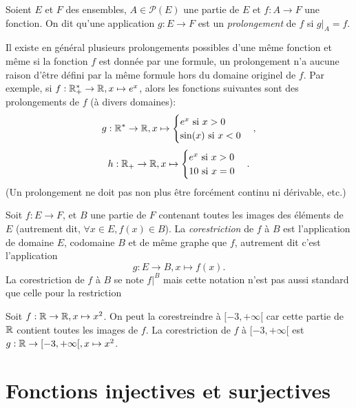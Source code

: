 \begin{definition}[Prolongement]
Soient $E$ et $F$ des ensembles, $A\in \mathcal P(E)$ une partie de $E$ et $f : A\to F$ une fonction. On dit qu'une application $g : E\to F$ est un \emph{prolongement} de $f$ si $g|_A = f$.
\end{definition}

\begin{attention}
Il existe en général plusieurs prolongements possibles d'une même fonction et même si la fonction $f$ est donnée par une formule, un prolongement n'a aucune raison d'être défini par la même formule hors du domaine originel de $f$. Par exemple, si $f : \mathbb{R}_+^* \to \mathbb{R}, x\mapsto e^x$, alors les fonctions suivantes  sont des prolongements de $f$ (à divers domaines):
\[g : \mathbb{R}^* \to \mathbb{R}, x\mapsto \begin{cases}e^x\text{ si } x>0\\ \sin(x) \text{ si } x<0\end{cases},\]
\[h : \mathbb{R}_+ \to \mathbb{R}, x\mapsto \begin{cases}e^x\text{ si } x>0\\ 10 \text{ si }x=0\end{cases}.\]
(Un prolongement ne doit pas non plus être forcément continu ni dérivable, etc.)
\end{attention}


\begin{definition}[Corestriction]\label{def-corestriction}
Soit $f : E\to F$, et $B$ une partie de $F$ contenant toutes les images des éléments de $E$ (autrement dit, $\forall x\in E, f(x)\in B$).
La \emph{corestriction} de $f$ à $B$ est l'application de domaine $E$, codomaine $B$ et de même graphe que $f$, autrement dit c'est l'application 
\[ g : E\to B, x\mapsto f(x).\]
La corestriction de $f$ à $B$ se note $f|^{B}$ mais cette notation n'est pas aussi standard que celle pour la restriction
\end{definition}

\begin{exemple}
Soit $f : \mathbb{R}\to \mathbb{R}, x\mapsto x^2$. On peut la corestreindre à $[-3,+\infty[$ car cette partie de $\mathbb{R}$ contient toutes les images de $f$. La corestriction de $f$ à $[-3,+\infty[$ est $g : \mathbb{R}\to [-3,+\infty[, x\mapsto x^2$.
\end{exemple}





\section{Fonctions injectives et surjectives}

